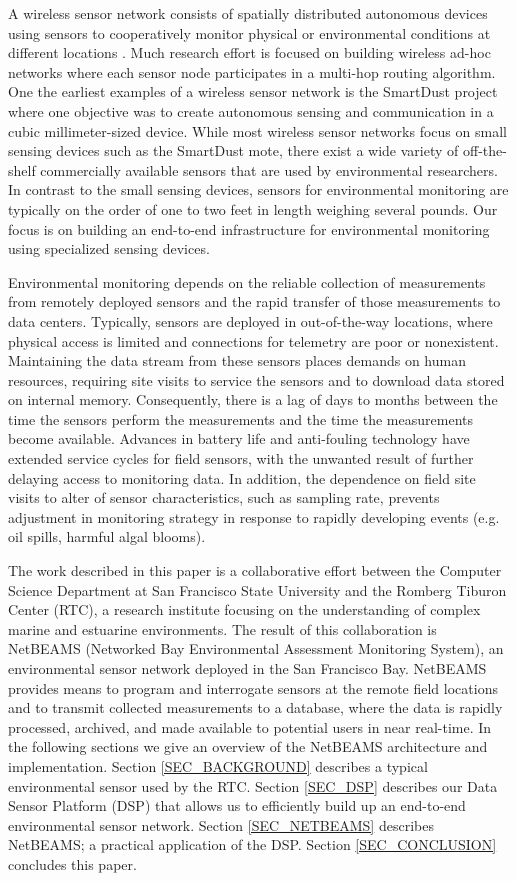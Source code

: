 \documentclass[conference]{IEEEtran}
\begin{document}
A wireless sensor network consists of spatially distributed autonomous
devices using sensors to cooperatively monitor physical or
environmental conditions at different locations \cite{roemer:2004}.
Much research effort is focused on building wireless ad-hoc networks
where each sensor node participates in a multi-hop routing algorithm.
One the earliest examples of a wireless sensor network is the
SmartDust project \cite{smartdust:2001} where one objective was to
create autonomous sensing and communication in a cubic
millimeter-sized device.  While most wireless sensor networks focus on
small sensing devices such as the SmartDust mote, there exist a wide
variety of off-the-shelf commercially available sensors that are used
by environmental researchers. In contrast to the small sensing
devices, sensors for environmental monitoring are typically on the
order of one to two feet in length weighing several pounds. Our
focus is on building an end-to-end infrastructure for environmental
monitoring using specialized sensing devices.

Environmental monitoring depends on the reliable collection of
measurements from remotely deployed sensors and the rapid transfer of
those measurements to data centers. Typically, sensors are deployed in
out-of-the-way locations, where physical access is limited and
connections for telemetry are poor or nonexistent. Maintaining the
data stream from these sensors places demands on human resources,
requiring site visits to service the sensors and to download data
stored on internal memory.  Consequently, there is a lag of days to
months between the time the sensors perform the measurements and the
time the measurements become available. Advances in battery life and
anti-fouling technology have extended service cycles for field
sensors, with the unwanted result of further delaying access to
monitoring data.  In addition, the dependence on field site visits to
alter of sensor characteristics, such as sampling rate, prevents
adjustment in monitoring strategy in response to rapidly developing
events (e.g. oil spills, harmful algal blooms).

The work described in this paper is a collaborative effort between the
Computer Science Department at San Francisco State University and the
Romberg Tiburon Center (RTC), a research institute focusing on the
understanding of complex marine and estuarine environments. The result
of this collaboration is NetBEAMS (Networked Bay Environmental
Assessment Monitoring System), an environmental sensor network
deployed in the San Francisco Bay. NetBEAMS provides means to program
and interrogate sensors at the remote field locations and to transmit
collected measurements to a database, where the data is rapidly
processed, archived, and made available to potential users in near
real-time. In the following sections we give an overview of the NetBEAMS
architecture and implementation.  Section \ref{SEC_BACKGROUND}
describes a typical environmental sensor used by the RTC. Section
\ref{SEC_DSP} describes our Data Sensor Platform (DSP) that allows us
to efficiently build up an end-to-end environmental sensor network.
Section \ref{SEC_NETBEAMS} describes NetBEAMS; a practical application
of the DSP. Section \ref{SEC_CONCLUSION} concludes this paper.
\end{document}

